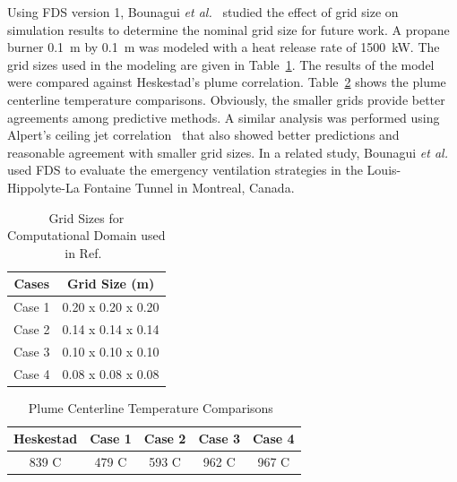 \documentclass[11pt]{book}
\begin{document}
Using FDS  version 1, Bounagui {\em  et al.}~\cite{Bounagui:1} studied
the effect of grid size on simulation results to determine the nominal
grid size for future work. A propane burner 0.1~m by 0.1~m was modeled
with  a heat  release rate  of  1500~kW. The  grid sizes  used in  the
modeling are  given in Table~\ref{gridsize}. The results  of the model
were         compared         against        Heskestad's         plume
correlation.   Table~\ref{Heskestad}   shows   the  plume   centerline
temperature comparisons.  Obviously, the smaller  grids provide better
agreements among predictive methods.  A similar analysis was performed
using  Alpert's ceiling  jet correlation~\cite{SFPE:Alpert}  that also
showed better  predictions and reasonable agreement  with smaller grid
sizes.  In a  related study,  Bounagui {\em  et al.}~\cite{Bounagui:2}
used  FDS to  evaluate  the emergency  ventilation  strategies in  the
Louis-Hippolyte-La Fontaine Tunnel in Montreal, Canada.

\begin{table}[ht]
\begin{center}
\caption{Grid    Sizes    for    Computational    Domain    used    in
Ref.~\cite{Bounagui:1}} \label{gridsize} \vspace{0.1in}
\begin{tabular}{|c|c|}
\hline Cases&Grid Size (m)\\ \hline \hline Case 1&0.20 x 0.20 x 0.20\\
\hline Case 2&0.14 x 0.14 x  0.14\\ \hline Case 3&0.10 x 0.10 x 0.10\\
\hline Case 4&0.08 x 0.08 x 0.08\\ \hline
\end{tabular}
\end{center}
\end{table}

\begin{table}[ht]
\begin{center}
\label{Heskestad} \caption{Plume Centerline Temperature Comparisons~\cite{Bounagui:1}} \vspace{0.1in}
\begin{tabular}{|c|c|c|c|c|}        \hline
Heskestad & Case 1 & Case 2 & Case  3 & Case 4 \\ \hline 839 C & 479 C
& 593 C & 962 C & 967 C \\ \hline
\end{tabular}
\end{center}
\end{table}
\end{document}
